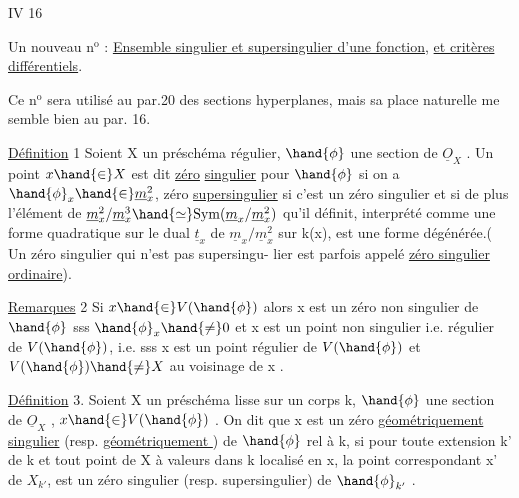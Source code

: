 
IV 16

Un nouveau n$^{\text{o}}$ : \uline{Ensemble singulier et supersingulier d'une fonction},
\uline{et critères différentiels}.

Ce n$^{\text{o}}$ sera utilisé au par.20 des sections hyperplanes, mais sa
place naturelle me semble bien au par. 16.

\uline{Définition} 1 Soient X un préschéma régulier, $\hand{\phi}$ une section de $\underline{O}_X$ . Un
point $x \hand{\in} X$ est dit \uline{zéro}  \uline{singulier} pour $\hand{\phi}$
si on a $\hand{\phi}_x \hand{\in} \underline{m}_x^2$, zéro \uline{supersingulier} si c'est un zéro singulier
et si de plus l'élément de $\underline{m}_x^2/\underline{m}_x^3 \hand{\simeq} \mathrm{Sym}(\underline{m}_x/\underline{m}_x^2)$ qu'il définit,
interprété comme une forme quadratique sur le dual $\underline{t}_x$ de $\underline{m}_x/\underline{m}_x^2$ sur k(x),
est une forme  dégénérée.( Un zéro singulier qui n'est pas supersingu-%
lier est parfois appelé \uline{zéro singulier ordinaire}).

\uline{Remarques} 2 Si $x \hand{\in} V(\hand{\phi})$\hand{,} alors x est un zéro non singulier de $\hand{\phi}$ sss
$\hand{\phi}_x \hand{\neq} 0$ et x est un point  non singulier i.e. régulier de $V(\hand{\phi})$,
i.e. sss x est un point régulier de $V(\hand{\phi})$ et $V(\hand{\phi}) \hand{\neq} X$ au voisinage de
x . 

\uline{Définition} 3. Soient X un préschéma lisse sur un corps k, $\hand{\phi}$ une
section de $\underline{O}_X$ , $x \hand{\in} V(\hand{\phi})$ . On dit que x est un zéro \uline{géométriquement}
\uline{singulier}  (resp. \uline{géométriquement } ) de $\hand{\phi}$ rel à k,
si pour toute extension k' de k et tout point \hand{$\xi$} de X à valeurs dans
k\hand{,} localisé en x, la  point correspondant x' de $X_{k'}$, est un zéro
 singulier (resp. supersingulier) de $\hand{\phi}_{k'}$ .

